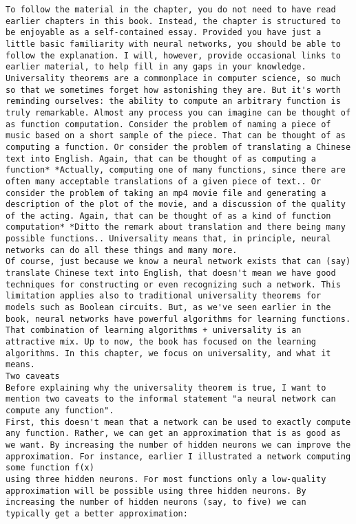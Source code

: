 \begin{lstlisting}
To follow the material in the chapter, you do not need to have read earlier chapters in this book. Instead, the chapter is structured to be enjoyable as a self-contained essay. Provided you have just a little basic familiarity with neural networks, you should be able to follow the explanation. I will, however, provide occasional links to earlier material, to help fill in any gaps in your knowledge.
Universality theorems are a commonplace in computer science, so much so that we sometimes forget how astonishing they are. But it's worth reminding ourselves: the ability to compute an arbitrary function is truly remarkable. Almost any process you can imagine can be thought of as function computation. Consider the problem of naming a piece of music based on a short sample of the piece. That can be thought of as computing a function. Or consider the problem of translating a Chinese text into English. Again, that can be thought of as computing a function* *Actually, computing one of many functions, since there are often many acceptable translations of a given piece of text.. Or consider the problem of taking an mp4 movie file and generating a description of the plot of the movie, and a discussion of the quality of the acting. Again, that can be thought of as a kind of function computation* *Ditto the remark about translation and there being many possible functions.. Universality means that, in principle, neural networks can do all these things and many more.
Of course, just because we know a neural network exists that can (say) translate Chinese text into English, that doesn't mean we have good techniques for constructing or even recognizing such a network. This limitation applies also to traditional universality theorems for models such as Boolean circuits. But, as we've seen earlier in the book, neural networks have powerful algorithms for learning functions. That combination of learning algorithms + universality is an attractive mix. Up to now, the book has focused on the learning algorithms. In this chapter, we focus on universality, and what it means.
Two caveats
Before explaining why the universality theorem is true, I want to mention two caveats to the informal statement "a neural network can compute any function".
First, this doesn't mean that a network can be used to exactly compute any function. Rather, we can get an approximation that is as good as we want. By increasing the number of hidden neurons we can improve the approximation. For instance, earlier I illustrated a network computing some function f(x)
using three hidden neurons. For most functions only a low-quality approximation will be possible using three hidden neurons. By increasing the number of hidden neurons (say, to five) we can typically get a better approximation:

\end{lstlisting}
